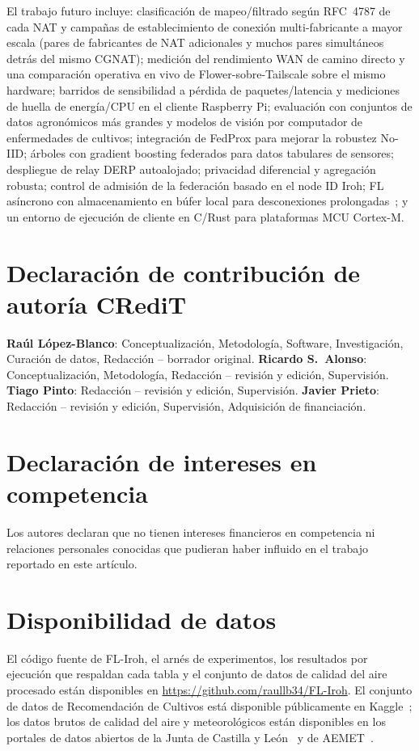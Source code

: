 \documentclass[journal]{IEEEtran}
\begin{document}
El trabajo futuro incluye: clasificación de mapeo/filtrado según RFC~4787 de cada NAT y campañas de establecimiento de conexión multi-fabricante a mayor escala (pares de fabricantes de NAT adicionales y muchos pares simultáneos detrás del mismo CGNAT); medición del rendimiento WAN de camino directo y una comparación operativa en vivo de Flower-sobre-Tailscale sobre el mismo hardware; barridos de sensibilidad a pérdida de paquetes/latencia y mediciones de huella de energía/CPU en el cliente Raspberry Pi; evaluación con conjuntos de datos agronómicos más grandes y modelos de visión por computador de enfermedades de cultivos; integración de FedProx para mejorar la robustez No-IID; árboles con gradient boosting federados para datos tabulares de sensores; despliegue de relay DERP autoalojado; privacidad diferencial y agregación robusta; control de admisión de la federación basado en el node ID Iroh; FL asíncrono con almacenamiento en búfer local para desconexiones prolongadas~\cite{fedbuff2022}; y un entorno de ejecución de cliente en C/Rust para plataformas MCU Cortex-M.

\section*{Declaración de contribución de autoría CRediT}
\textbf{Ra\'ul L\'opez-Blanco}: Conceptualización, Metodología, Software, Investigación, Curación de datos, Redacción -- borrador original. \textbf{Ricardo S.~Alonso}: Conceptualización, Metodología, Redacción -- revisión y edición, Supervisión. \textbf{Tiago Pinto}: Redacción -- revisión y edición, Supervisión. \textbf{Javier Prieto}: Redacción -- revisión y edición, Supervisión, Adquisición de financiación.

\section*{Declaración de intereses en competencia}
Los autores declaran que no tienen intereses financieros en competencia ni relaciones personales conocidas que pudieran haber influido en el trabajo reportado en este artículo.

\section*{Disponibilidad de datos}
El código fuente de FL-Iroh, el arnés de experimentos, los resultados por ejecución que respaldan cada tabla y el conjunto de datos de calidad del aire procesado están disponibles en \url{https://github.com/raullb34/FL-Iroh}. El conjunto de datos de Recomendación de Cultivos está disponible públicamente en Kaggle~\cite{cropdataset}; los datos brutos de calidad del aire y meteorológicos están disponibles en los portales de datos abiertos de la Junta de Castilla y Le\'on~\cite{cyl2023airquality} y de AEMET~\cite{aemet2023}.
\end{document}
